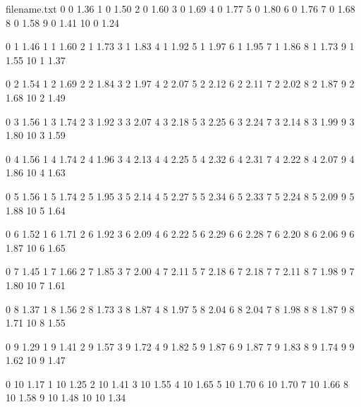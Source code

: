 \documentclass{beamer}
\begin{document}
\begin{filecontents*}{filename.txt}
    0 0 1.36
    1 0 1.50
    2 0 1.60
    3 0 1.69
    4 0 1.77
    5 0 1.80
    6 0 1.76
    7 0 1.68
    8 0 1.58
    9 0 1.41
    10 0 1.24
    
    0 1 1.46
    1 1 1.60
    2 1 1.73
    3 1 1.83
    4 1 1.92
    5 1 1.97
    6 1 1.95
    7 1 1.86
    8 1 1.73
    9 1 1.55
    10 1 1.37
    
    0 2 1.54
    1 2 1.69
    2 2 1.84
    3 2 1.97
    4 2 2.07
    5 2 2.12
    6 2 2.11
    7 2 2.02
    8 2 1.87
    9 2 1.68
    10 2 1.49
    
    0 3 1.56
    1 3 1.74
    2 3 1.92
    3 3 2.07
    4 3 2.18
    5 3 2.25
    6 3 2.24
    7 3 2.14
    8 3 1.99
    9 3 1.80
    10 3 1.59
    
    0 4 1.56
    1 4 1.74
    2 4 1.96
    3 4 2.13
    4 4 2.25
    5 4 2.32
    6 4 2.31
    7 4 2.22
    8 4 2.07
    9 4 1.86
    10 4 1.63
    
    0 5 1.56
    1 5 1.74
    2 5 1.95
    3 5 2.14
    4 5 2.27
    5 5 2.34
    6 5 2.33
    7 5 2.24
    8 5 2.09
    9 5 1.88
    10 5 1.64
    
    0 6 1.52
    1 6 1.71
    2 6 1.92
    3 6 2.09
    4 6 2.22
    5 6 2.29
    6 6 2.28
    7 6 2.20
    8 6 2.06
    9 6 1.87
    10 6 1.65
    
    0 7 1.45
    1 7 1.66
    2 7 1.85
    3 7 2.00
    4 7 2.11
    5 7 2.18
    6 7 2.18
    7 7 2.11
    8 7 1.98
    9 7 1.80
    10 7 1.61
    
    0 8 1.37
    1 8 1.56
    2 8 1.73
    3 8 1.87
    4 8 1.97
    5 8 2.04
    6 8 2.04
    7 8 1.98
    8 8 1.87
    9 8 1.71
    10 8 1.55
    
    0 9 1.29
    1 9 1.41
    2 9 1.57
    3 9 1.72
    4 9 1.82
    5 9 1.87
    6 9 1.87
    7 9 1.83
    8 9 1.74
    9 9 1.62
    10 9 1.47
    
    0 10 1.17
    1 10 1.25
    2 10 1.41
    3 10 1.55
    4 10 1.65
    5 10 1.70
    6 10 1.70
    7 10 1.66
    8 10 1.58
    9 10 1.48
    10 10 1.34
\end{filecontents*}
\end{document}
